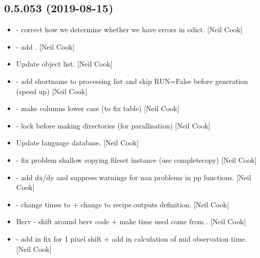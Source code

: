 \documentclass[a4paper,10pt,english]{report}
\begin{document}
\subsection{0.5.053 (2019-08-15)}
\label{\detokenize{misc/changelog:id90}}\begin{itemize}
\item {} 
 - correct how we determine whether
we have errors in odict. {[}Neil Cook{]}

\item {} 
 - add . {[}Neil Cook{]}

\item {} 
Update object list. {[}Neil Cook{]}

\item {} 
 - add shortname to processing list
and skip RUN=False before generation (speed up) {[}Neil Cook{]}

\item {} 
 - make columns lower case (to fix table) {[}Neil
Cook{]}

\item {} 
 - lock before making directories (for
parallisation) {[}Neil Cook{]}

\item {} 
Update language database. {[}Neil Cook{]}

\item {} 
 - fix problem shallow copying
fileset instance (use completecopy) {[}Neil Cook{]}

\item {} 
 - add dx/dy and suppress warnings
for nan problems in pp functions. {[}Neil Cook{]}

\item {} 
 - change times to  + change  to
recipe.outputs definition. {[}Neil Cook{]}

\item {} 
Berv - shift around berv code + make time used come from .
{[}Neil Cook{]}

\item {} 
 - add in fix for 1 pixel shift + add in
calculation of mid observation time. {[}Neil Cook{]}


\end{itemize}
\end{document}
